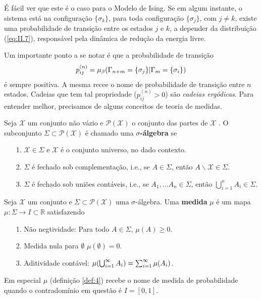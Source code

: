 É fácil ver que este é o caso para o Modelo de Ising. Se em algum instante, o sistema está na configuração $\{\sigma_k\}$, para toda configuração $\{ \sigma_j \}$, com $j \neq k$, existe uma probabilidade de transição entre os estados $j$ e $k$, a depender da distribuição (\ref{eq:II.7}), responsável pela dinâmica de redução da energia livre. 

\vspace*{1.5mm}
 Um importante ponto a se notar é que a probabilidade de transição 
\begin{equation*}
	p^{(n)}_{ij} = \mu_\beta (\Gamma_{n+m} = \{ \sigma_j \} \vert \Gamma_m = \{ \sigma_i \})
\end{equation*}
é sempre positiva. A mesma recee o nome de probabilidade de transição entre $n$ estados. Cadeias que tem tal propriedade ($p_{ij}^{(n)} > 0$) são \textit{cadeias ergódicas}. Para entender melhor, precisamos de alguns conceitos de teoria de medidas.

\begin{definition}
	Seja $\mathcal{X}$ um conjunto não vázio e $\mathcal{P}(\mathcal{X})$ o conjunto das partes de $\mathcal{X}$ . O subconjunto $\Sigma \subset \mathcal{P}(\mathcal{X})$ é chamado uma \textbf{$\sigma$-álgebra}  se
	\begin{itemize}
		\item[1.] $\mathcal{X} \in \Sigma$ e $\mathcal{X}$ é o conjunto universo, no dado contexto.
		\item[2.] $\Sigma$ é fechado sob complementação, i.e., se $A \in \Sigma$, então $A \backslash \mathcal{X} \in \Sigma$.
		\item[3.] $\Sigma$ é fechado sob uniões contáveis, i.e., se $A_1, ... A_n\in \Sigma$, então $\bigcup_{i=1}^n A_i \in \Sigma$.
	\end{itemize}
\end{definition}

\begin{definition}
	Seja $\mathcal{X}$ um conjunto e $\Sigma \subset \mathcal{P}(\mathcal{X})$ uma $\sigma$-álgebra. Uma \textbf{medida} $\mu$ é um mapa $\mu \colon \Sigma \to I \subset \mathbb{R}$ satisfazendo
	\begin{itemize}
		\item[1.] Não negtividade: Para todo $A \in \Sigma$, $\mu(A) \geq 0$.
		\item[2.] Medida nula para $\emptyset$ $\mu(\emptyset) = 0$.
		\item[3.] Aditividade contável: $\mu \qty(\bigcup_{i=1}^\infty A_i) = \sum_{i=1}^\infty \mu (A_i)$.
	\end{itemize}
	\label{def:4}
\end{definition}
Em especial $\mu$ (definição \ref{def:4}) recebe o nome de medida de probabilidade quando o contradomínio em questão é $I = [0, 1]$. 

